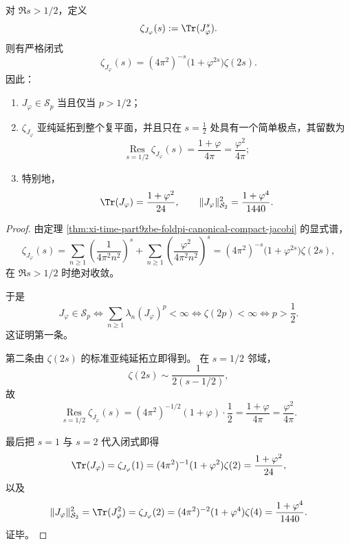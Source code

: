\begin{theorem}\label{thm:xi-time-part9zbe-foldpi-jacobi-schatten-zeta}
对 \(\Re s>1/2\)，定义
\[
\zeta_{J_\varphi}(s):=\Tr(J_\varphi^s).
\]
则有严格闭式
\[
\zeta_{J_\varphi}(s)
=
(4\pi^2)^{-s}\bigl(1+\varphi^{2s}\bigr)\zeta(2s).
\]
因此：
\begin{enumerate}
  \item \(J_\varphi\in \mathcal S_p\) 当且仅当 \(p>1/2\)；
  \item \(\zeta_{J_\varphi}\) 亚纯延拓到整个复平面，并且只在 \(s=\tfrac12\) 处具有一个简单极点，其留数为
  \[
  \operatorname*{Res}_{s=1/2}\zeta_{J_\varphi}(s)
  =
  \frac{1+\varphi}{4\pi}
  =
  \frac{\varphi^2}{4\pi};
  \]
  \item 特别地，
  \[
  \Tr(J_\varphi)=\frac{1+\varphi^2}{24},
  \qquad
  \|J_\varphi\|_{\mathcal S_2}^2=\frac{1+\varphi^4}{1440}.
  \]
\end{enumerate}
\end{theorem}
\begin{proof}
由定理 \ref{thm:xi-time-part9zbe-foldpi-canonical-compact-jacobi} 的显式谱，
\[
\zeta_{J_\varphi}(s)
=
\sum_{n\ge 1}\left(\frac{1}{4\pi^2n^2}\right)^s
+
\sum_{n\ge 1}\left(\frac{\varphi^2}{4\pi^2n^2}\right)^s
=
(4\pi^2)^{-s}\bigl(1+\varphi^{2s}\bigr)\zeta(2s),
\]
在 \(\Re s>1/2\) 时绝对收敛。

于是
\[
J_\varphi\in \mathcal S_p
\iff
\sum_{n\ge 1}\lambda_n(J_\varphi)^p<\infty
\iff
\zeta(2p)<\infty
\iff
p>\frac12.
\]
这证明第一条。

第二条由 \(\zeta(2s)\) 的标准亚纯延拓立即得到。
在 \(s=1/2\) 邻域，
\[
\zeta(2s)\sim \frac{1}{2(s-1/2)},
\]
故
\[
\operatorname*{Res}_{s=1/2}\zeta_{J_\varphi}(s)
=
(4\pi^2)^{-1/2}(1+\varphi)\cdot \frac12
=
\frac{1+\varphi}{4\pi}
=
\frac{\varphi^2}{4\pi}.
\]

最后把 \(s=1\) 与 \(s=2\) 代入闭式即得
\[
\Tr(J_\varphi)=\zeta_{J_\varphi}(1)
=(4\pi^2)^{-1}(1+\varphi^2)\zeta(2)
=
\frac{1+\varphi^2}{24},
\]
以及
\[
\|J_\varphi\|_{\mathcal S_2}^2
=
\Tr(J_\varphi^2)
=
\zeta_{J_\varphi}(2)
=(4\pi^2)^{-2}(1+\varphi^4)\zeta(4)
=
\frac{1+\varphi^4}{1440}.
\]
证毕。
\end{proof}

